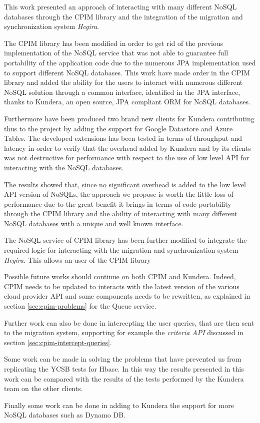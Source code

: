 This work presented an approach of interacting with many different NoSQL databases through the CPIM library and the integration of the migration and synchronization system \textit{Hegira}.

\newparagraph The CPIM library has been modified in order to get rid of the previous implementation of the NoSQL service that was not able to guarantee full portability of the application code due to the numerous JPA implementation used to support different NoSQL databases. This work have made order in the CPIM library and added the ability for the users to interact with numerous different NoSQL solution through a common interface, identified in the JPA interface, thanks to Kundera, an open source, JPA compliant ORM for NoSQL databases.

\noindent Furthermore have been produced two brand new clients for Kundera contributing thus to the project by adding the support for Google Datastore and Azure Tables. The developed extensions has been tested in terms of throughput and latency in order to verify that the overhead added by Kundera and by its clients was not destructive for performance with respect to the use of low level API for interacting with the NoSQL databases.

\noindent The results showed that, since no significant overhead is added to the low level API version of NoSQLs, the approach we propose is worth the little loss of performance due to the great benefit it brings in terms of code portability through the CPIM library and the ability of interacting with many different NoSQL databases with a unique and well known interface.

\newparagraph The NoSQL service of CPIM library has been further modified to integrate the required logic for interacting with the migration and synchronization system \textit{Hegira}. This allows an user of the CPIM library 
 
\newparagraph Possible future works should continue on both CPIM and Kundera. Indeed, CPIM needs to be updated to interacts with the latest version of the various cloud provider API and some components needs to be rewritten, as explained in section \ref{sec:cpim-problems} for the Queue service.

\noindent Further work can also be done in intercepting the user queries, that are then sent to the migration system, supporting for example the \textit{criteria API} discussed in section \ref{sec:cpim-intercept-queries}.

\noindent Some work can be made in solving the problems that have prevented us from replicating the YCSB tests for Hbase. In this way the results presented in this work can be compared with the results of the tests performed by the Kundera team on the other clients.

\noindent Finally some work can be done in adding to Kundera the support for more NoSQL databases such as Dynamo DB.
